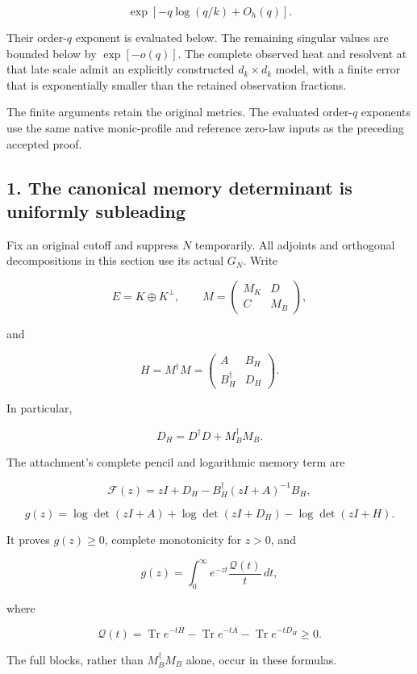 \documentclass[11pt]{article}
\begin{document}
\[
\exp[-q\log(q/k)+O_h(q)].
\]

Their order-\(q\) exponent is evaluated below. The remaining singular values are bounded below by \(\exp[-o(q)]\). The complete observed heat and resolvent at that late scale admit an explicitly constructed \(d_k\times d_k\) model, with a finite error that is exponentially smaller than the retained observation fractions.

The finite arguments retain the original metrics. The evaluated order-\(q\) exponents use the same native monic-profile and reference zero-law inputs as the preceding accepted proof.

\subsection{1. The canonical memory determinant is uniformly subleading}\label{the-canonical-memory-determinant-is-uniformly-subleading}

Fix an original cutoff and suppress \(N\) temporarily. All adjoints and orthogonal decompositions in this section use its actual \(G_N\). Write

\[
E=K\oplus K^\perp,
\qquad
M=
\begin{pmatrix}
M_K&D\\
C&M_B
\end{pmatrix},
\]

and

\[
H=M^\dagger M=
\begin{pmatrix}
A&B_H\\
B_H^\dagger&D_H
\end{pmatrix}.
\]

In particular,

\[
D_H=D^\dagger D+M_B^\dagger M_B.
\]

The attachment's complete pencil and logarithmic memory term are

\[
\mathcal F(z)
=zI+D_H-B_H^\dagger(zI+A)^{-1}B_H,
\]

\[
g(z)
=\log\det(zI+A)+\log\det(zI+D_H)-\log\det(zI+H).
\tag{2}
\]

It proves \(g(z)\ge0\), complete monotonicity for \(z>0\), and

\[
g(z)=\int_0^\infty e^{-zt}\frac{\mathcal Q(t)}t\,dt,
\]

where

\[
\mathcal Q(t)
=\operatorname{Tr}e^{-tH}
-\operatorname{Tr}e^{-tA}
-\operatorname{Tr}e^{-tD_H}\ge0.
\]

The full blocks, rather than \(M_B^\dagger M_B\) alone, occur in these formulas.
\end{document}
